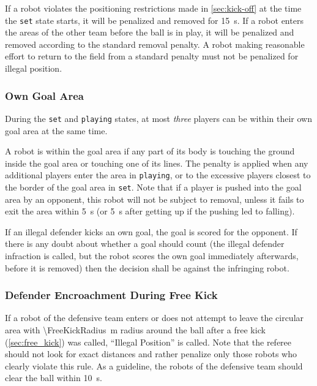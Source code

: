 If a robot violates the positioning restrictions made in \cref{sec:kick-off} at the time the \texttt{set} state starts, it will be penalized and removed for \qty{15}{\second}.
If a robot enters the areas of the other team before the ball is in play, it will be penalized and removed according to the standard removal penalty.
A robot making reasonable effort to return to the field from a standard penalty must not be penalized for illegal position.

\subsubsection{Own Goal Area}
\label{sec:ip_own_goal_area}

During the \texttt{set} and \texttt{playing} states, at most \textit{three} players can be within their own goal area at the same time.

A robot is within the goal area if any part of its body is touching the ground inside the goal area or touching one of its lines.
The penalty is applied when any additional players enter the area in \texttt{playing}, or to the excessive players closest to the border of the goal area in \texttt{set}.
Note that if a player is pushed into the goal area by an opponent, this robot will not be subject to removal, unless it fails to exit the area within \qty{5}{\second} (or \qty{5}{\second} after getting up if the pushing led to falling).

If an illegal defender kicks an own goal, the goal is scored for the opponent.
If there is any doubt about whether a goal should count (\eg the illegal defender infraction is called, but the robot scores the own goal immediately afterwards, before it is removed) then the decision shall be against the infringing robot.

\subsubsection{Defender Encroachment During Free Kick}
\label{sec:ip_free_kick}

If a robot of the defensive team enters or does not attempt to leave the circular area with \qty{\FreeKickRadius}{\metre} radius around the ball after a free kick (\cf \cref{sec:free_kick}) was called, ``Illegal Position'' is called.
Note that the referee should not look for exact distances and rather penalize only those robots who clearly violate this rule.
As a guideline, the robots of the defensive team should clear the ball within \qty{10}{\second}.

